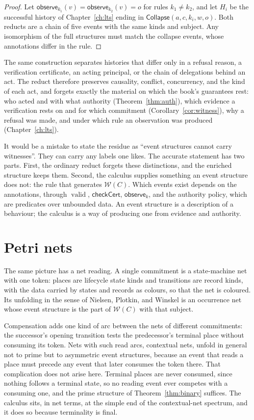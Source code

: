 \documentclass[11pt,openany]{book}
\theoremstyle{remark}
\newcommand{\Collapse}{\mathsf{Collapse}}
\newcommand{\valid}{\operatorname{valid}}
\begin{document}
\begin{proof}
Let $\mathsf{observe}_{k_1}(v)=\mathsf{observe}_{k_2}(v)=o$ for rules
$k_1\ne k_2$, and let $H_i$ be the successful history of
Chapter~\ref{ch:lts} ending in $\Collapse(a,c,k_i,w,o)$. Both reducts are a
chain of five events with the same kinds and subject. Any isomorphism of
the full structures must match the collapse events, whose annotations
differ in the rule.
\end{proof}

The same construction separates histories that differ only in a refusal
reason, a verification certificate, an acting principal, or the chain of
delegations behind an act. The reduct therefore preserves causality,
conflict, concurrency, and the kind of each act, and forgets exactly the
material on which the book's guarantees rest: who acted and with what
authority (Theorem~\ref{thm:auth}), which evidence a verification rests on
and for which commitment (Corollary~\ref{cor:witness}), why a refusal was
made, and under which rule an observation was produced
(Chapter~\ref{ch:lts}).

It would be a mistake to state the residue as ``event structures cannot
carry witnesses''. They can carry any labels one likes. The accurate
statement has two parts. First, the ordinary reduct forgets these
distinctions, and the enriched structure keeps them. Second, the
calculus supplies something an event structure does not: the rule that
generates $\mathcal W(C)$. Which events exist depends on the annotations,
through $\valid$, $\mathsf{checkCert}$, $\mathsf{observe}_k$, and the
authority policy, which are predicates over unbounded data. An event
structure is a description of a behaviour; the calculus is a way of
producing one from evidence and authority.

\section{Petri nets}

The same picture has a net reading. A single commitment is a state-machine
net with one token: places are lifecycle state kinds and transitions are
record kinds, with the data carried by states and records as colours, so
that the net is coloured. Its unfolding in the sense of Nielsen, Plotkin,
and Winskel is an occurrence net whose event structure is the part of
$\mathcal W(C)$ with that subject.

Compensation adds one kind of arc between the nets of different
commitments: the successor's opening transition tests the predecessor's
terminal place without consuming its token. Nets with such read arcs,
contextual nets, unfold in general not to prime but to asymmetric event
structures, because an event that reads a place must precede any event
that later consumes the token there. That complication does not arise
here. Terminal places are never consumed, since nothing follows a
terminal state, so no reading event ever competes with a consuming one,
and the prime structure of Theorem~\ref{thm:binary} suffices. The
calculus sits, in net terms, at the simple end of the contextual-net
spectrum, and it does so because terminality is final.
\end{document}
